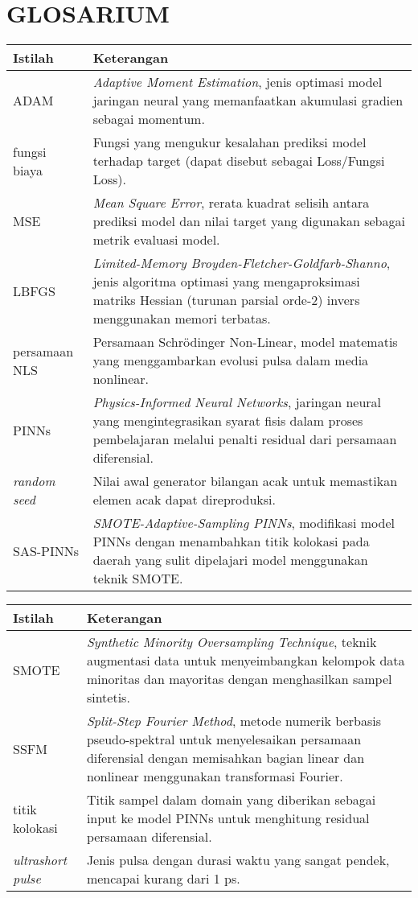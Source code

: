 \chapter*{GLOSARIUM}
\vspace{1cm}
\begin{tabular}{lp{}}
\textbf{Istilah} & \textbf{Keterangan} \\
\hline
ADAM & \emph{Adaptive Moment Estimation}, jenis optimasi model jaringan neural yang memanfaatkan akumulasi gradien sebagai momentum. \\
fungsi biaya & Fungsi yang mengukur kesalahan prediksi model terhadap target (dapat disebut sebagai Loss/Fungsi Loss). \\
MSE & \emph{Mean Square Error}, rerata kuadrat selisih antara prediksi model dan nilai target yang digunakan sebagai metrik evaluasi model. \\
LBFGS & \emph{Limited-Memory Broyden-Fletcher-Goldfarb-Shanno}, jenis algoritma optimasi yang mengaproksimasi matriks Hessian (turunan parsial orde-2) invers menggunakan memori terbatas. \\
persamaan NLS & Persamaan Schr\"{o}dinger Non-Linear, model matematis yang menggambarkan evolusi pulsa dalam media nonlinear. \\
PINNs & \emph{Physics-Informed Neural Networks}, jaringan neural yang mengintegrasikan syarat fisis dalam proses pembelajaran melalui penalti residual dari persamaan diferensial. \\
\emph{random seed} & Nilai awal generator bilangan acak untuk memastikan elemen acak dapat direproduksi.\\
SAS-PINNs & \emph{SMOTE-Adaptive-Sampling PINNs}, modifikasi model PINNs dengan menambahkan titik kolokasi pada daerah yang sulit dipelajari model menggunakan teknik SMOTE. \\
\end{tabular}

\begin{tabular}{lp{}}
\textbf{Istilah} & \textbf{Keterangan} \\
\hline
SMOTE & \emph{Synthetic Minority Oversampling Technique}, teknik augmentasi data untuk menyeimbangkan kelompok data minoritas dan mayoritas dengan menghasilkan sampel sintetis. \\
SSFM & \emph{Split-Step Fourier Method}, metode numerik berbasis pseudo-spektral untuk menyelesaikan persamaan diferensial dengan memisahkan bagian linear dan nonlinear menggunakan transformasi Fourier. \\
titik kolokasi & Titik sampel dalam domain yang diberikan sebagai input ke model PINNs untuk menghitung residual persamaan diferensial. \\
\emph{ultrashort pulse} & Jenis pulsa dengan durasi waktu yang sangat pendek, mencapai kurang dari 1 ps.\\
\end{tabular}
\cleardoublepage

